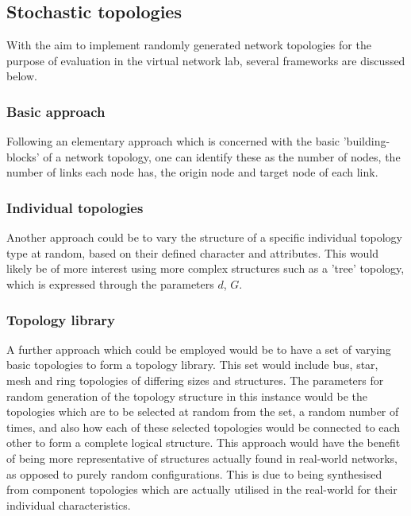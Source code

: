 \subsection{Stochastic topologies}
With the aim to implement randomly generated network topologies for the purpose of evaluation in the virtual network lab, several frameworks are discussed below.
\subsubsection{Basic approach}
Following an elementary approach which is concerned with the basic 'building-blocks' of a network topology, one can identify these as the number of nodes, the number of links each node has, the origin node and target node of each link. 

\subsubsection{Individual topologies}
Another approach could be to vary the structure of a specific individual topology type at random, based on their defined character and attributes. This would likely be of more interest using more complex structures such as a 'tree' topology, which is expressed through the parameters $d$, $G$.

\subsubsection{Topology library}
A further approach which could be employed would be to have a set of varying basic topologies to form a topology library. This set would include bus, star, mesh and ring topologies of differing sizes and structures. The parameters for random generation of the topology structure in this instance would be the topologies which are to be selected at random from the set, a random number of times, and also how each of these selected topologies would be connected to each other to form a complete logical structure. This approach would have the benefit of being more representative of structures actually found in real-world networks, as opposed to purely random configurations. This is due to being synthesised from component topologies which are actually utilised in the real-world for their individual characteristics.

